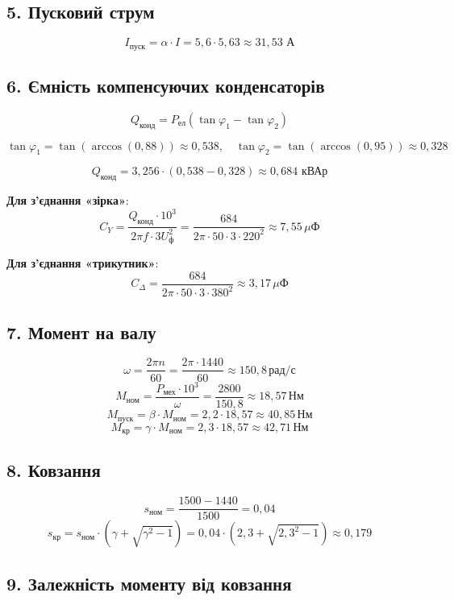 \documentclass[a4paper]{article}
\begin{document}
\subsection*{5. Пусковий струм}
\[
I_{\text{пуск}} = \alpha \cdot I = 5{,}6 \cdot 5{,}63 \approx 31{,}53 \text{ А}
\]

\subsection*{6. Ємність компенсуючих конденсаторів}
\[
Q_{\text{конд}} = P_{\text{ел}} (\tan \varphi_1 - \tan \varphi_2)
\]

\[
\tan \varphi_1 = \tan(\arccos(0{,}88)) \approx 0{,}538,\quad \tan \varphi_2 = \tan(\arccos(0{,}95)) \approx 0{,}328
\]

\[
Q_{\text{конд}} = 3{,}256 \cdot (0{,}538 - 0{,}328) \approx 0{,}684 \text{ кВАр}
\]

\textbf{Для з'єднання «зірка»}:
\[
C_Y = \frac{Q_{\text{конд}} \cdot 10^3}{2 \pi f \cdot 3 U_{\text{ф}}^2} = \frac{684}{2 \pi \cdot 50 \cdot 3 \cdot 220^2} \approx 7{,}55 \, \mu\text{Ф}
\]

\textbf{Для з'єднання «трикутник»}:
\[
C_\Delta = \frac{684}{2 \pi \cdot 50 \cdot 3 \cdot 380^2} \approx 3{,}17 \, \mu\text{Ф}
\]

\subsection*{7. Момент на валу}

\[
\omega = \frac{2\pi n}{60} = \frac{2\pi \cdot 1440}{60} \approx 150{,}8 \, \text{рад/с}
\]
\[
M_{\text{ном}} = \frac{P_{\text{мех}} \cdot 10^3}{\omega} = \frac{2800}{150{,}8} \approx 18{,}57 \, \text{Нм}
\]
\[
M_{\text{пуск}} = \beta \cdot M_{\text{ном}} = 2{,}2 \cdot 18{,}57 \approx 40{,}85 \, \text{Нм}
\]
\[
M_{\text{кр}} = \gamma \cdot M_{\text{ном}} = 2{,}3 \cdot 18{,}57 \approx 42{,}71 \, \text{Нм}
\]

\subsection*{8. Ковзання}
\[
s_{\text{ном}} = \frac{1500 - 1440}{1500} = 0{,}04
\]
\[
s_{\text{кр}} = s_{\text{ном}} \cdot (\gamma + \sqrt{\gamma^2 - 1}) = 0{,}04 \cdot (2{,}3 + \sqrt{2{,}3^2 - 1}) \approx 0{,}179
\]

\subsection*{9. Залежність моменту від ковзання}
\end{document}
